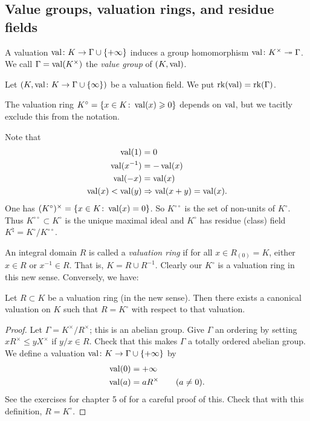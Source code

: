 \subsection{Value groups, valuation rings, and residue fields}

A valuation $\operatorname{val}\colon K\to \Gamma\cup\{+\infty\}$ induces a group 
homomorphism $\operatorname{val}\colon K^\times \twoheadrightarrow \Gamma$. We call 
$\Gamma=\operatorname{val}(K^\times)$ the \emph{value group} of $(K,\operatorname{val})$. 

\begin{definition}
Let $(K,\operatorname{val}\colon K\to \Gamma\cup\{\infty\})$ be a valuation field. We 
put $\operatorname{rk}(\operatorname{val})=\operatorname{rk}(\Gamma)$. 
\end{definition}

The valuation ring $K^\circ=\{x\in K\colon \operatorname{val}(x)\geqslant 0\}$ depends 
on $\operatorname{val}$, but we tacitly exclude this from the notation. 

Note that 
\begin{align*}
  \operatorname{val}(1) &= 0 \\
  \operatorname{val}(x^{-1}) &= -\operatorname{val}(x) \\
  \operatorname{val}(-x) &= \operatorname{val}(x) \\
  \operatorname{val}(x) < \operatorname{val}(y) &\Rightarrow \operatorname{val}(x+y) = \operatorname{val}(x) .
\end{align*}
One has $(K^\circ)^\times = \{x\in K\colon \operatorname{val}(x)=0\}$. So 
$K^{\circ\circ}$ is the set of non-units of $K^\circ$. Thus 
$K^{\circ\circ}\subset K^\circ$ is the unique maximal ideal and $K^\circ$ has 
residue (class) field $K^\natural=K^\circ/K^{\circ\circ}$. 

An integral domain $R$ is called a \emph{valuation ring} if for all 
$x\in R_{(0)}=K$, either $x\in R$ or $x^{-1}\in R$. That is, 
$K=R\cup R^{-1}$. Clearly our $K^\circ$ is a valuation ring in this new
sense. Conversely, we have: 

\begin{lemma}
Let $R\subset K$ be a valuation ring (in the new sense). 
Then there exists a canonical valuation on $K$ such that $R=K^\circ$ with 
respect to that valuation. 
\end{lemma}
\begin{proof}
Let $\Gamma=K^\times/R^\times$; this is an abelian group. Give $\Gamma$ an 
ordering by setting $x R^\times \leqslant y X^\times$ if $y/x\in R$. Check 
that this makes $\Gamma$ a totally ordered abelian group. We define a valuation 
$\operatorname{val}\colon K\to \Gamma\cup\{+\infty\}$ by 
\begin{align*}
  \operatorname{val}(0) &= +\infty \\
  \operatorname{val}(a) &= a R^\times \qquad (a\ne 0) .
\end{align*}
See the exercises for chapter 5 of \cite{atiyah-macdonald} for a careful 
proof of this. Check that with this definition, $R=K^\circ$. 
\end{proof}

